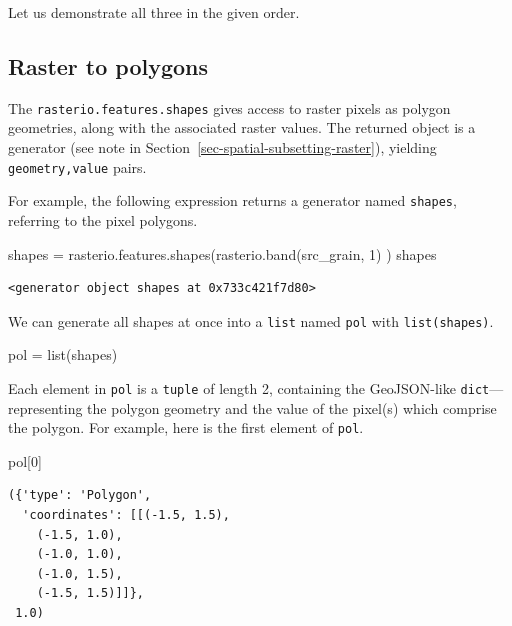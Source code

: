 \documentclass[
  letterpaper,
]{krantz}
\newenvironment{Shaded}{\begin{snugshade}}{\end{snugshade}}
\newcommand{\BuiltInTok}[1]{\textcolor[rgb]{0.00,0.23,0.31}{#1}}
\newcommand{\DecValTok}[1]{\textcolor[rgb]{0.68,0.00,0.00}{#1}}
\newcommand{\NormalTok}[1]{\textcolor[rgb]{0.00,0.23,0.31}{#1}}
\newcommand{\OperatorTok}[1]{\textcolor[rgb]{0.37,0.37,0.37}{#1}}
\begin{document}
Let us demonstrate all three in the given order.

\subsection{Raster to polygons}\label{sec-raster-to-polygons}

The \texttt{rasterio.features.shapes} gives access to raster pixels as
polygon geometries, along with the associated raster values. The
returned object is a generator (see note in
Section~\ref{sec-spatial-subsetting-raster}), yielding
\texttt{geometry,value} pairs.

For example, the following expression returns a generator named
\texttt{shapes}, referring to the pixel polygons.

\begin{Shaded}
\begin{Highlighting}[]
\NormalTok{shapes }\OperatorTok{=}\NormalTok{ rasterio.features.shapes(rasterio.band(src\_grain, }\DecValTok{1}\NormalTok{) )}
\NormalTok{shapes}
\end{Highlighting}
\end{Shaded}

\begin{verbatim}
<generator object shapes at 0x733c421f7d80>
\end{verbatim}

We can generate all shapes at once into a \texttt{list} named
\texttt{pol} with \texttt{list(shapes)}.

\begin{Shaded}
\begin{Highlighting}[]
\NormalTok{pol }\OperatorTok{=} \BuiltInTok{list}\NormalTok{(shapes)}
\end{Highlighting}
\end{Shaded}

Each element in \texttt{pol} is a \texttt{tuple} of length 2, containing
the GeoJSON-like \texttt{dict}---representing the polygon geometry and
the value of the pixel(s) which comprise the polygon. For example, here
is the first element of \texttt{pol}.

\begin{Shaded}
\begin{Highlighting}[]
\NormalTok{pol[}\DecValTok{0}\NormalTok{]}
\end{Highlighting}
\end{Shaded}

\begin{verbatim}
({'type': 'Polygon',
  'coordinates': [[(-1.5, 1.5),
    (-1.5, 1.0),
    (-1.0, 1.0),
    (-1.0, 1.5),
    (-1.5, 1.5)]]},
 1.0)
\end{verbatim}
\end{document}
